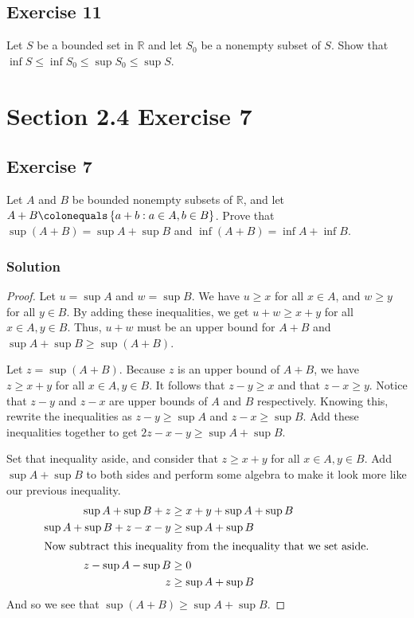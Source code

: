 \documentclass[12pt]{article}
\begin{document}
\begin{flushleft}
\subsection*{Exercise 11}
Let $S$ be a bounded set in $\mathbb{R}$ and let $S_0$ be a nonempty subset of $S$. Show that $\inf S \leq \inf S_0 \leq \sup S_0 \leq \sup S$.

\section*{Section 2.4 Exercise 7}

\subsection*{Exercise 7}

Let $A$ and $B$ be bounded nonempty subsets of $\mathbb{R}$, and let $A + B \colonequals \left\{a + b : a \in A, b \in B\right\}$. Prove that $\sup\left(A + B\right) = \sup A + \sup B$ and $\inf \left(A + B\right) = \inf A + \inf B$.

\subsubsection*{Solution}
\begin{proof}
Let $u = \sup A$ and $w = \sup B$. We have $u \geq x$ for all $x \in A$, and $w \geq y$ for all $y \in B$. By adding these inequalities, we get $u + w \geq x + y$ for all $x \in A, y \in B$. Thus, $u + w$ must be an upper bound for $A + B$ and $\sup A + \sup B \geq \sup \left(A + B\right)$.

Let $z = \sup\left(A + B\right)$. Because $z$ is an upper bound of $A + B$, we have $z \geq x + y$ for all $x \in A, y \in B$. It follows that $z - y \geq x$ and that $z - x \geq y$. Notice that $z - y$ and $z - x$ are upper bounds of $A$ and $B$ respectively. Knowing this, rewrite the inequalities as $z - y \geq \sup A$ and $z - x \geq \sup B$. Add these inequalities together to get $2z - x - y \geq \sup A + \sup B$.

Set that inequality aside, and consider that $z \geq x + y$ for all $x \in A, y \in B$. Add $\sup A + \sup B$ to both sides and perform some algebra to make it look more like our previous inequality.
\begin{align*}
\sup A + \sup B + z &\geq x + y + \sup A + \sup B\\
\sup A + \sup B + z - x - y &\geq \sup A + \sup B\\
\intertext{Now subtract this inequality from the inequality that we set aside.}
z - \sup A - \sup B &\geq 0\\
z &\geq \sup A +\sup B \\
\end{align*}
And so we see that $\sup\left(A + B\right) \geq \sup A + \sup B$.


\end{proof}
\end{flushleft}
\end{document}
